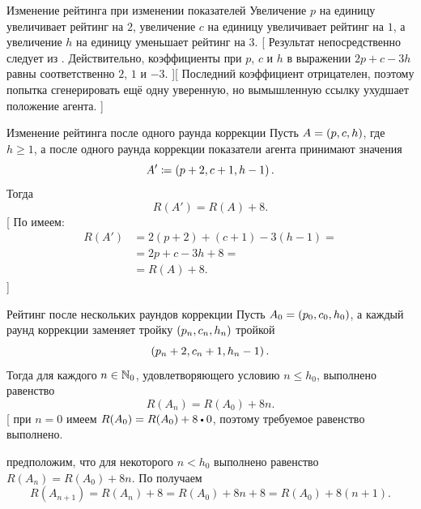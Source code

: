 {Изменение рейтинга при изменении показателей}{
    Увеличение $p$ на единицу увеличивает рейтинг на $2$, увеличение $c$ на единицу увеличивает рейтинг на $1$, а увеличение $h$ на единицу уменьшает рейтинг на $3$.
}[
    Результат непосредственно следует из .
    Действительно, коэффициенты при $p$, $c$ и $h$ в выражении $2p + c - 3h$ равны соответственно $2$, $1$ и $-3$.
][
    Последний коэффициент отрицателен, поэтому попытка сгенерировать ещё одну уверенную, но вымышленную ссылку ухудшает положение агента.
]

{Изменение рейтинга после одного раунда коррекции}{
    Пусть $A = \left(p, c, h\right)$, где $h \ge 1$, а после одного раунда коррекции показатели агента принимают значения
    \begin{equation*}
        A' \coloneqq \left(p + 2, c + 1, h - 1\right).
    \end{equation*}
    Тогда
    \begin{equation*}
        R(A') = R(A) + 8.
    \end{equation*}
}[
    По  имеем:
    \begin{equation*}
        \begin{aligned}
            R(A')
                & = 2(p + 2) + (c + 1) - 3(h - 1) = \\
                & = 2p + c - 3h + 8 = \\
                & = R(A) + 8.
        \end{aligned}
    \end{equation*}
]

{Рейтинг после нескольких раундов коррекции}{
    Пусть $A_0 = \left(p_0, c_0, h_0\right)$, а каждый раунд коррекции заменяет тройку $\left(p_n, c_n, h_n\right)$ тройкой
    \begin{equation*}
        \left(p_n + 2, c_n + 1, h_n - 1\right).
    \end{equation*}
    Тогда для каждого $n \in \mathbb{N}_0$, удовлетворяющего условию $n \le h_0$, выполнено равенство
    \begin{equation*}
        R(A_n) = R(A_0) + 8n.
    \end{equation*}
}[
     при $n = 0$ имеем $R(A_0) = R(A_0) + 8 \mul 0$, поэтому требуемое равенство выполнено.

     предположим, что для некоторого $n < h_0$ выполнено равенство $R(A_n) = R(A_0) + 8n$.
    По  получаем
    \begin{equation*}
        R(A_{n + 1}) = R(A_n) + 8 = R(A_0) + 8n + 8 = R(A_0) + 8(n + 1).
    \end{equation*}

